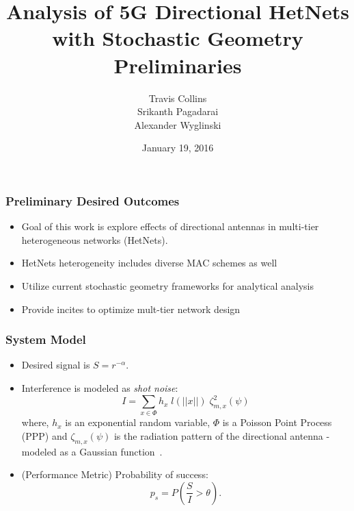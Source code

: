 \documentclass{beamer}
\title{\textcolor{WPI_red} {Analysis of 5G Directional HetNets \\with Stochastic Geometry}\\Preliminaries}
\author{Travis Collins\\ Srikanth Pagadarai \\ Alexander Wyglinski}
\date{January 19, 2016}
\begin{document}
\frame{\maketitle}

\begin{frame}
    \frametitle{\color{WPI_red} Preliminary Desired Outcomes}
    \begin{itemize}
        \item Goal of this work is explore effects of directional antennas in multi-tier heterogeneous networks (HetNets).
        \item HetNets heterogeneity includes diverse MAC schemes as well
        \item Utilize current stochastic geometry frameworks for analytical analysis
        \item Provide incites to optimize mult-tier network design
    \end{itemize}
\end{frame}


\begin{frame}
\frametitle{\color{WPI_red} System Model}
\begin{itemize}

\item Desired signal is $S = r^{-\alpha}$.
\item Interference is modeled as \textit{shot noise}:
\begin{equation*}
I = \sum_{x\in \Phi} h_x\;l(||x||)\; \zeta_{m, x}^2(\psi)
\end{equation*}
where, $h_x$ is an exponential random variable, $\Phi$ is a Poisson Point Process (PPP) and $\zeta_{m, x}(\psi)$ is the radiation pattern of the directional antenna - modeled as a Gaussian function~\cite{werner2015}.

\item (Performance Metric) Probability of success:
\begin{equation*}
p_s = P\left( \frac{S}{I} > \theta \right).
\end{equation*}

\end{itemize}

\end{frame}
\end{document}
